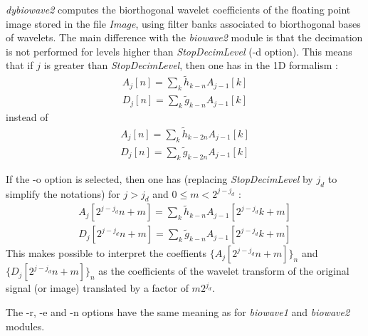 \parindent 0.6cm 
\parskip 0.4cm

{\em dybiowave2} computes the biorthogonal wavelet coefficients  
of the floating point image stored in the file {\em Image}, 
using filter banks associated to biorthogonal bases of wavelets. 
The main difference with the {\em biowave2} module is that the decimation 
is not performed for levels higher than {\em StopDecimLevel} (-d option). 
This means that if $j$ is greater than {\em StopDecimLevel}, then one has 
in the 1D formalism : 
\begin{eqnarray*}
A_{j}[n] = \sum_{k} \tilde{h}_{k-n} A_{j-1}[k] \\
D_{j}[n] = \sum_{k} \tilde{g}_{k-n} A_{j-1}[k] 
\end{eqnarray*}
instead of
\begin{eqnarray*}
A_{j}[n] = \sum_{k} \tilde{h}_{k-2n} A_{j-1}[k] \\
D_{j}[n] = \sum_{k} \tilde{g}_{k-2n} A_{j-1}[k] 
\end{eqnarray*}

If the -o option is selected, then one has (replacing {\em StopDecimLevel} 
by $j_d$ to simplify the notations) for $j > j_d$ and $0\leq m < 2^{j-j_d}$ : 
\begin{eqnarray*}
A_{j}[2^{j-j_d}n+m] = \sum_{k} \tilde{h}_{k-n} A_{j-1}[2^{j-j_d}k+m] \\
D_{j}[2^{j-j_d}n+m] = \sum_{k} \tilde{g}_{k-n} A_{j-1}[2^{j-j_d}k+m] 
\end{eqnarray*}
This makes possible to interpret the coeffients $\{A_{j}[2^{j-j_d}n+m]\}_n$ 
and $\{D_{j}[2^{j-j_d}n+m]\}_n$ as the coefficients of the wavelet transform 
of the original signal (or image) translated by a factor of $m2^{j_d}$.

The -r, -e and -n options have the same meaning as for {\em biowave1} and 
{\em biowave2} modules. 




\parindent 0.0cm 
\parskip 0.0cm
